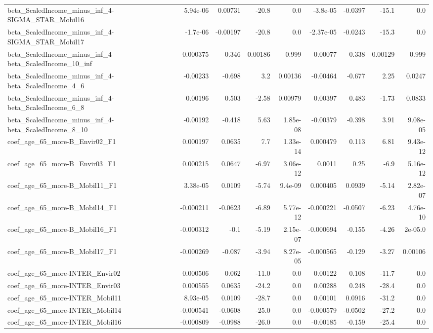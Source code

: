 \begin{tabular}{lrrrrrrrr}
beta_ScaledIncome_minus_inf_4-SIGMA_STAR_Mobil16 & 5.94e-06 & 0.00731 & -20.8 & 0.0 & -3.8e-05 & -0.0397 & -15.1 & 0.0 \\
beta_ScaledIncome_minus_inf_4-SIGMA_STAR_Mobil17 & -1.7e-06 & -0.00197 & -20.8 & 0.0 & -2.37e-05 & -0.0243 & -15.3 & 0.0 \\
beta_ScaledIncome_minus_inf_4-beta_ScaledIncome_10_inf & 0.000375 & 0.346 & 0.00186 & 0.999 & 0.00077 & 0.338 & 0.00129 & 0.999 \\
beta_ScaledIncome_minus_inf_4-beta_ScaledIncome_4_6 & -0.00233 & -0.698 & 3.2 & 0.00136 & -0.00464 & -0.677 & 2.25 & 0.0247 \\
beta_ScaledIncome_minus_inf_4-beta_ScaledIncome_6_8 & 0.00196 & 0.503 & -2.58 & 0.00979 & 0.00397 & 0.483 & -1.73 & 0.0833 \\
beta_ScaledIncome_minus_inf_4-beta_ScaledIncome_8_10 & -0.00192 & -0.418 & 5.63 & 1.85e-08 & -0.00379 & -0.398 & 3.91 & 9.08e-05 \\
coef_age_65_more-B_Envir02_F1 & 0.000197 & 0.0635 & 7.7 & 1.33e-14 & 0.000479 & 0.113 & 6.81 & 9.43e-12 \\
coef_age_65_more-B_Envir03_F1 & 0.000215 & 0.0647 & -6.97 & 3.06e-12 & 0.0011 & 0.25 & -6.9 & 5.16e-12 \\
coef_age_65_more-B_Mobil11_F1 & 3.38e-05 & 0.0109 & -5.74 & 9.4e-09 & 0.000405 & 0.0939 & -5.14 & 2.82e-07 \\
coef_age_65_more-B_Mobil14_F1 & -0.000211 & -0.0623 & -6.89 & 5.77e-12 & -0.000221 & -0.0507 & -6.23 & 4.76e-10 \\
coef_age_65_more-B_Mobil16_F1 & -0.000312 & -0.1 & -5.19 & 2.15e-07 & -0.000694 & -0.155 & -4.26 & 2e-05.0 \\
coef_age_65_more-B_Mobil17_F1 & -0.000269 & -0.087 & -3.94 & 8.27e-05 & -0.000565 & -0.129 & -3.27 & 0.00106 \\
coef_age_65_more-INTER_Envir02 & 0.000506 & 0.062 & -11.0 & 0.0 & 0.00122 & 0.108 & -11.7 & 0.0 \\
coef_age_65_more-INTER_Envir03 & 0.000555 & 0.0635 & -24.2 & 0.0 & 0.00288 & 0.248 & -28.4 & 0.0 \\
coef_age_65_more-INTER_Mobil11 & 8.93e-05 & 0.0109 & -28.7 & 0.0 & 0.00101 & 0.0916 & -31.2 & 0.0 \\
coef_age_65_more-INTER_Mobil14 & -0.000541 & -0.0608 & -25.0 & 0.0 & -0.000579 & -0.0502 & -27.2 & 0.0 \\
coef_age_65_more-INTER_Mobil16 & -0.000809 & -0.0988 & -26.0 & 0.0 & -0.00185 & -0.159 & -25.4 & 0.0 \\

\end{tabular}
